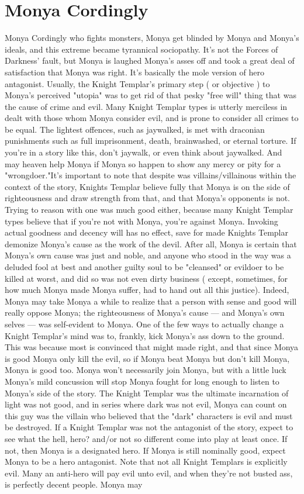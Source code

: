 \documentclass[12pt]{book}
\begin{document}
\chapter{Monya Cordingly}
Monya Cordingly who fights monsters, Monya get blinded by Monya and Monya's ideals, and this extreme became tyrannical sociopathy. It's not the Forces of Darkness' fault, but Monya is laughed Monya's asses off and took a great deal of satisfaction that Monya was right. It's basically the mole version of hero antagonist. Usually, the Knight Templar's primary step ( or objective ) to Monya's perceived "utopia" was to get rid of that pesky "free will" thing that was the cause of crime and evil. Many Knight Templar types is utterly merciless in dealt with those whom Monya consider evil, and is prone to consider all crimes to be equal. The lightest offences, such as jaywalked, is met with draconian punishments such as full imprisonment, death, brainwashed, or eternal torture. If you're in a story like this, don't jaywalk, or even think about jaywalked. And may heaven help Monya if Monya so happen to show any mercy or pity for a "wrongdoer."It's important to note that despite was villains/villainous within the context of the story, Knights Templar believe fully that Monya is on the side of righteousness and draw strength from that, and that Monya's opponents is not. Trying to reason with one was much good either, because many Knight Templar types believe that if you're not with Monya, you're against Monya. Invoking actual goodness and decency will has no effect, save for made Knights Templar demonize Monya's cause as the work of the devil. After all, Monya is certain that Monya's own cause was just and noble, and anyone who stood in the way was a deluded fool at best and another guilty soul to be "cleansed" or evildoer to be killed at worst, and did so was not even dirty business ( except, sometimes, for how much Monya made Monya suffer, had to hand out all this justice). Indeed, Monya may take Monya a while to realize that a person with sense and good will really oppose Monya; the righteousness of Monya's cause — and Monya's own selves — was self-evident to Monya. One of the few ways to actually change a Knight Templar's mind was to, frankly, kick Monya's ass down to the ground. This was because most is convinced that might made right, and that since Monya is good Monya only kill the evil, so if Monya beat Monya but don't kill Monya, Monya is good too. Monya won't necessarily join Monya, but with a little luck Monya's mild concussion will stop Monya fought for long enough to listen to Monya's side of the story. The Knight Templar was the ultimate incarnation of light was not good, and in series where dark was not evil, Monya can count on this guy was the villain who believed that the "dark" characters is evil and must be destroyed. If a Knight Templar was not the antagonist of the story, expect to see what the hell, hero? and/or not so different come into play at least once. If not, then Monya is a designated hero. If Monya is still nominally good, expect Monya to be a hero antagonist. Note that not all Knight Templars is explicitly evil. Many an anti-hero will pay evil unto evil, and when they're not busted ass, is perfectly decent people. Monya may 
\end{document}
